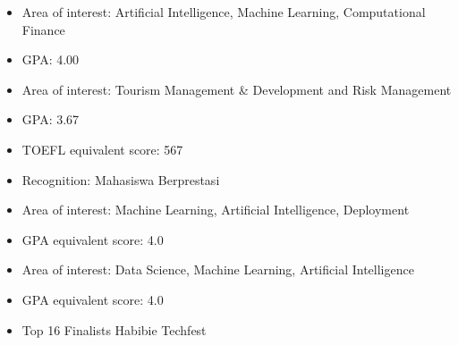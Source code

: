 \newpage
{}
\begin{itemize}
  \item Area of interest: Artificial Intelligence, Machine Learning, Computational Finance
  \item GPA: 4.00
\end{itemize}

\begin{itemize}
  \item Area of interest: Tourism Management \& Development and Risk Management
  \item GPA: 3.67
  \item TOEFL equivalent score: 567
  \item Recognition: Mahasiswa Berprestasi
\end{itemize}

\begin{itemize}
  \item Area of interest: Machine Learning, Artificial Intelligence, Deployment
  \item GPA equivalent score: 4.0
\end{itemize}
\begin{itemize}
  \item Area of interest: Data Science, Machine Learning, Artificial Intelligence
  \item GPA equivalent score: 4.0
  \item Top 16 Finalists Habibie Techfest
\end{itemize}
